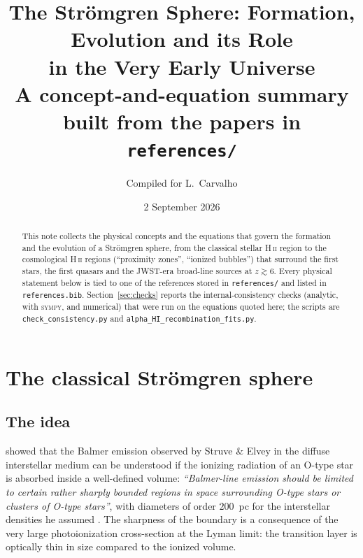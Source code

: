 \documentclass[11pt,a4paper]{article}
\title{\bf The Str\"omgren Sphere: Formation, Evolution and its Role\\ in the Very Early Universe\\[2mm]
\large A concept-and-equation summary built from the papers in \texttt{references/}}
\author{Compiled for L.\ Carvalho}
\date{2 September 2026}
\newcommand{\ion}[2]{\textrm{#1\,\textsc{#2}}}
\begin{document}
\maketitle

\begin{abstract}
\noindent
This note collects the physical concepts and the equations that govern the formation and the
evolution of a Str\"omgren sphere, from the classical stellar \ion{H}{ii} region
\citep{Stromgren1939} to the cosmological \ion{H}{ii} regions (``proximity zones'', ``ionized
bubbles'') that surround the first stars, the first quasars and the JWST-era broad-line sources at
$z\gtrsim6$. Every physical statement below is tied to one of the references stored in
\texttt{references/} and listed in \texttt{references.bib}. Section~\ref{sec:checks} reports the
internal-consistency checks (analytic, with \textsc{sympy}, and numerical) that were run on the
equations quoted here; the scripts are \texttt{check\_consistency.py} and
\texttt{alpha\_HI\_recombination\_fits.py}.
\end{abstract}

\tableofcontents

\section{The classical Str\"omgren sphere}
\label{sec:classical}

\subsection{The idea}
\citet{Stromgren1939} showed that the Balmer emission observed by Struve \& Elvey in the diffuse
interstellar medium can be understood if the ionizing radiation of an O-type star is absorbed inside
a well-defined volume: \emph{``Balmer-line emission should be limited to certain rather sharply
bounded regions in space surrounding O-type stars or clusters of O-type stars''}, with diameters of
order $200$~pc for the interstellar densities he assumed \citep{Stromgren1939}. The sharpness of the
boundary is a consequence of the very large photoionization cross-section at the Lyman limit: the
transition layer is optically thin in size compared to the ionized volume.
\end{document}
